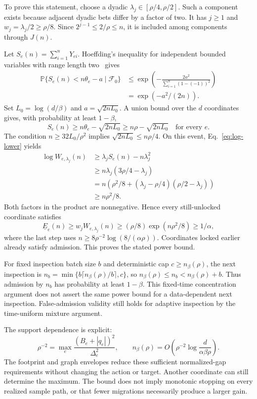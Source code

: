 \documentclass[11pt]{article}
\newcommand{\Prb}{\mathbb P}
\newcommand{\F}{\mathcal F}
\begin{document}
To prove this statement, choose a dyadic $\lambda_j\in[\rho/4,\rho/2]$. Such a component exists because adjacent dyadic bets differ by a factor of two. It has $j\ge1$ and $w_j=\lambda_j/2\ge\rho/8$. Since $2^{j-1}\le2/\rho\le n$, it is included among components through $J(n)$.

Let $S_e(n)=\sum_{i=1}^nY_{ei}$. Hoeffding's inequality for independent bounded variables with range length two~\cite{hoeffding1963} gives
\begin{align}
 \Prb\{S_e(n)<n\theta_e-a\mid\F_0\}
 &\le\exp\left(-\frac{2a^2}{\sum_{i=1}^n(1-(-1))^2}\right)\\
 &=\exp(-a^2/(2n)).
\end{align}
Set $L_0=\log(d/\beta)$ and $a=\sqrt{2nL_0}$. A union bound over the $d$ coordinates gives, with probability at least $1-\beta$,
\begin{equation}
 S_e(n)\ge n\theta_e-\sqrt{2nL_0}\ge n\rho-\sqrt{2nL_0}\quad\text{for every }e.
\end{equation}
The condition $n\ge32L_0/\rho^2$ implies $\sqrt{2nL_0}\le n\rho/4$. On this event, Eq.~\eqref{eq:log-lower} yields
\begin{align}
 \log W_{e,\lambda_j}(n)
 &\ge\lambda_jS_e(n)-n\lambda_j^2\\
 &\ge n\lambda_j(3\rho/4-\lambda_j)\\
 &=n\left(\rho^2/8+(\lambda_j-\rho/4)(\rho/2-\lambda_j)\right)\\
 &\ge n\rho^2/8.
\end{align}
Both factors in the product are nonnegative. Hence every still-unlocked coordinate satisfies
\begin{equation}
 \underline E_e(n)\ge w_jW_{e,\lambda_j}(n)\ge(\rho/8)\exp(n\rho^2/8)\ge1/\alpha,
\end{equation}
where the last step uses $n\ge8\rho^{-2}\log(8/(\alpha\rho))$. Coordinates locked earlier already satisfy admission. This proves the stated power bound.

For fixed inspection batch size $b$ and deterministic cap $c\ge n_\beta(\rho)$, the next inspection is $n_b=\min\{b\lceil n_\beta(\rho)/b\rceil,c\}$, so $n_\beta(\rho)\le n_b<n_\beta(\rho)+b$. Thus admission by $n_b$ has probability at least $1-\beta$. This fixed-time concentration argument does not assert the same power bound for a data-dependent next inspection. False-admission validity still holds for adaptive inspection by the time-uniform mixture argument.

The support dependence is explicit:
\begin{equation}
 \rho^{-2}=\max_e\frac{(B_e+|q_e|)^2}{\Delta_e^2},\qquad
 n_\beta(\rho)=O\!\left(\rho^{-2}\log\frac{d}{\alpha\beta\rho}\right).
\end{equation}
The footprint and graph envelopes reduce these sufficient normalized-gap requirements without changing the action or target. Another coordinate can still determine the maximum. The bound does not imply monotonic stopping on every realized sample path, or that fewer migrations necessarily produce a larger gain.
\end{document}

